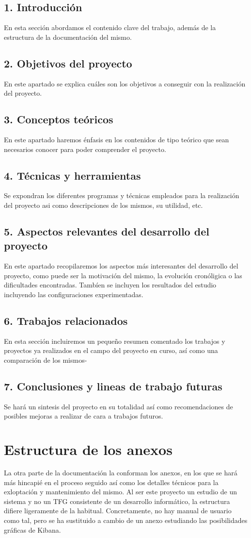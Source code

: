 \subsection{  1. Introducción}
En esta sección abordamos el contenido clave del trabajo, además de la estructura de la documentación del mismo.
\subsection{  2. Objetivos del proyecto}
En este apartado se explica cuáles son los objetivos a conseguir con la realización del proyecto.
\subsection{  3. Conceptos teóricos}
En este apartado haremos énfasis en los contenidos de tipo teórico que sean necesarios conocer para poder comprender el proyecto.
\subsection{  4. Técnicas y herramientas}
Se expondran los diferentes programas y técnicas empleados para la realización del proyecto asi como descripciones de los mismos, su utilidad, etc.
\subsection{  5. Aspectos relevantes del desarrollo del proyecto}
En este apartado recopilaremos los aspectos más interesantes del desarrollo del proyecto, como puede ser la motivación del mismo, la evolución cronóligica o las dificultades encontradas. Tambíen se incluyen los resultados del estudio incluyendo las configuraciones experimentadas.
\subsection{  6. Trabajos relacionados}
En esta sección incluiremos un pequeño resumen comentado los trabajos y proyectos ya realizados en el campo del proyecto en curso, así como una comparación de los mismos-
\subsection{  7. Conclusiones y lineas de trabajo futuras}
Se hará un sintesis del proyecto en su totalidad así como recomendaciones de posibles mejoras a realizar de cara a trabajos futuros.

\section{Estructura de los anexos}
La otra parte de la documentación la conforman los anexos, en los que se hará más hincapié en el proceso seguido así como los detalles técnicos para la exloptación y mantenimiento del mismo. Al ser este proyecto un estudio de un sistema y no un TFG consistente de un desarrollo informático, la estructura difiere ligeramente de la habitual. Concretamente, no hay manual de usuario como tal, pero se ha sustituido a cambio de un anexo estudiando las posibilidades gráficas de Kibana.

